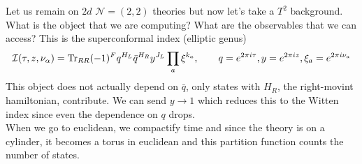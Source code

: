\documentclass[11pt]{article}
\theoremstyle{definition}
\numberwithin{equation}{section}
\begin{document}
Let us remain on $2d$ $\mathcal{N}=(2,2)$ theories but now let's take a $T^{2}$ background. What is the object that we are computing? What are the observables that we can access? This is the superconformal index (elliptic genus)
\begin{equation}
	\mathcal{I}(\tau,z,\nu_{\alpha}) = \operatorname{Tr}_{RR}(-1)^{F}q^{H_{L}}\bar{q}^{H_{R}}y^{J_{L}}\prod_{a}\xi^{k_{a}},\qquad q=e^{2\pi i\tau},y=e^{2\pi i z},\xi_{a}=e^{2\pi i \nu_{a}}
\end{equation}
This object does not actually depend on $\bar{q}$, only states with $H_{R}$, the right-movint hamiltonian, contribute. We can send $y\rightarrow 1$ which reduces this to the Witten index since even the dependence on $q$ drops.\\
When we go to euclidean, we compactify time and since the theory is on a cylinder, it becomes a torus in euclidean and this partition function counts the number of states.
\end{document}
